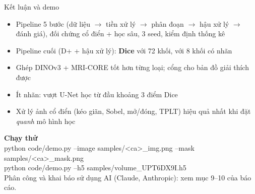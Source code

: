 \documentclass[aspectratio=169,10pt]{beamer}
\newcommand{\hl}[1]{{\color{ptitred}\textbf{#1}}}
\begin{document}
\begin{frame}{Kết luận và demo}
\begin{itemize}
\item Pipeline 5 bước (dữ liệu $\to$ tiền xử lý $\to$ phân đoạn $\to$ hậu xử lý $\to$ đánh giá), đối chứng cổ điển + học sâu, 3 seed, kiểm định thống kê
\item Pipeline cuối (D+ + hậu xử lý): \textbf{Dice \DicePpGateEdgeFull} với 72 khối, \textbf{\DicePpGateEdgeFew} với 8 khối có nhãn
\item Ghép DINOv3 + MRI-CORE tốt hơn từng loại; cổng cho bản đồ giải thích được
\item Ít nhãn: vượt U-Net học từ đầu khoảng 3 điểm Dice
\item Xử lý ảnh cổ điển (kéo giãn, Sobel, mở/đóng, TPLT) hiệu quả nhất khi đặt \emph{quanh} mô hình học
\end{itemize}
\vspace{3mm}
\hl{Chạy thử}\\[1mm]
{\footnotesize\ttfamily python code/demo.py --image samples/<ca>\_img.png --mask samples/<ca>\_mask.png\\
python code/demo.py --h5 samples/volume\_UPT6DX9I.h5}\\[3mm]
{\small\color{ink2} Phân công và khai báo sử dụng AI (Claude, Anthropic): xem mục 9--10 của báo cáo.}
\end{frame}
\end{document}
